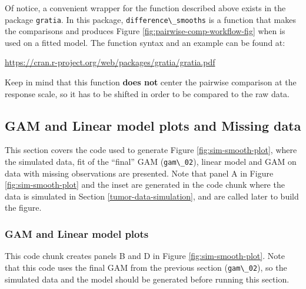 \documentclass[
]{article}
\newcommand{\passthrough}[1]{#1}
\begin{document}
Of notice, a convenient wrapper for the function described above exists in the package \passthrough{\lstinline!gratia!}. In this package, \passthrough{\lstinline!difference\_smooths!} is a function that makes the comparisons and produces Figure \ref{fig:pairwise-comp-workflow-fig} when is used on a fitted model. The function syntax and an example can be found at:

\url{https://cran.r-project.org/web/packages/gratia/gratia.pdf}

Keep in mind that this function \textbf{does not} center the pairwise comparison at the response scale, so it has to be shifted in order to be compared to the raw data.

\hypertarget{gam-and-linear-model-plots-and-missing-data}{%
\subsection{GAM and Linear model plots and Missing data}\label{gam-and-linear-model-plots-and-missing-data}}

This section covers the code used to generate Figure \ref{fig:sim-smooth-plot}, where the simulated data, fit of the ``final'' GAM (\passthrough{\lstinline!gam\_02!}), linear model and GAM on data with missing observations are presented. Note that panel A in Figure \ref{fig:sim-smooth-plot} and the inset are generated in the code chunk where the data is simulated in Section \ref{tumor-data-simulation}, and are called later to build the figure.

\hypertarget{gam-and-linear-model-plots}{%
\subsubsection{GAM and Linear model plots}\label{gam-and-linear-model-plots}}

This code chunk creates panels B and D in Figure \ref{fig:sim-smooth-plot}. Note that this code uses the final GAM from the previous section (\passthrough{\lstinline!gam\_02!}), so the simulated data and the model should be generated before running this section.
\end{document}

